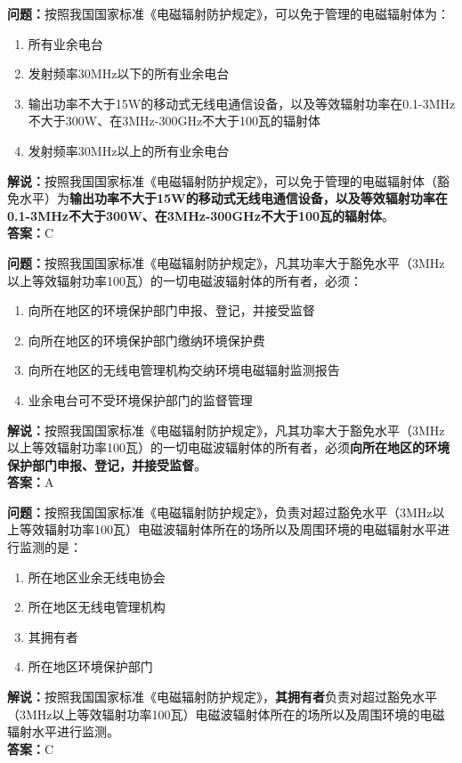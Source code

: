 \bigskip


\noindent\textbf{问题：}按照我国国家标准《电磁辐射防护规定》，可以免于管理的电磁辐射体为：
\begin{enumerate}[label=\Alph*), leftmargin=3em]
	\item 所有业余电台
	\item 发射频率30MHz以下的所有业余电台
	\item 输出功率不大于15W的移动式无线电通信设备，以及等效辐射功率在0.1-3MHz不大于300W、在3MHz-300GHz不大于100瓦的辐射体
	\item 发射频率30MHz以上的所有业余电台
\end{enumerate}
\noindent\textbf{解说：}按照我国国家标准《电磁辐射防护规定》，可以免于管理的电磁辐射体（豁免水平）为\textbf{输出功率不大于15W的移动式无线电通信设备，以及等效辐射功率在0.1-3MHz不大于300W、在3MHz-300GHz不大于100瓦的辐射体}。\\\textbf{答案：}C


\bigskip


\noindent\textbf{问题：}按照我国国家标准《电磁辐射防护规定》，凡其功率大于豁免水平（3MHz以上等效辐射功率100瓦）的一切电磁波辐射体的所有者，必须：
\begin{enumerate}[label=\Alph*), leftmargin=3em]
	\item 向所在地区的环境保护部门申报、登记，并接受监督
	\item 向所在地区的环境保护部门缴纳环境保护费
	\item 向所在地区的无线电管理机构交纳环境电磁辐射监测报告
	\item 业余电台可不受环境保护部门的监督管理
\end{enumerate}
\noindent\textbf{解说：}按照我国国家标准《电磁辐射防护规定》，凡其功率大于豁免水平（3MHz以上等效辐射功率100瓦）的一切电磁波辐射体的所有者，必须\textbf{向所在地区的环境保护部门申报、登记，并接受监督}。\\
\textbf{答案：}A

\bigskip


\noindent\textbf{问题：}按照我国国家标准《电磁辐射防护规定》，负责对超过豁免水平（3MHz以上等效辐射功率100瓦）电磁波辐射体所在的场所以及周围环境的电磁辐射水平进行监测的是：
\begin{enumerate}[label=\Alph*), leftmargin=3em]
	\item 所在地区业余无线电协会
	\item 所在地区无线电管理机构
	\item 其拥有者
	\item 所在地区环境保护部门
\end{enumerate}
\noindent\textbf{解说：}按照我国国家标准《电磁辐射防护规定》，\textbf{其拥有者}负责对超过豁免水平（3MHz以上等效辐射功率100瓦）电磁波辐射体所在的场所以及周围环境的电磁辐射水平进行监测。\\\textbf{答案：}C


